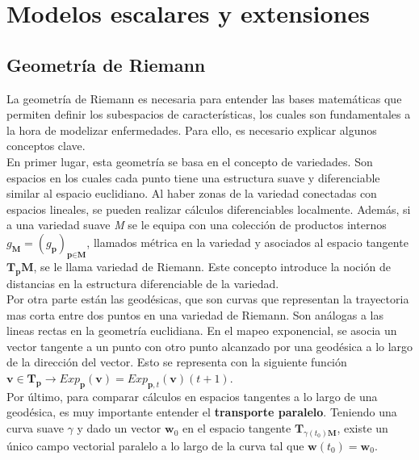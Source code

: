 	
	
	\section{Modelos escalares y extensiones}
	\subsection{Geometría de Riemann}
	La geometría de Riemann es necesaria para entender las bases matemáticas que permiten definir los subespacios de características, los cuales son fundamentales a la hora de modelizar enfermedades. Para ello, es necesario explicar algunos conceptos clave. \\
	
	En primer lugar, esta geometría se basa en el concepto de variedades. Son espacios en los cuales cada punto tiene una estructura suave y diferenciable similar al espacio euclidiano. Al haber zonas de la variedad conectadas con espacios lineales, se pueden realizar cálculos diferenciables localmente. Además, si a una variedad suave \textit{M} se le equipa con una colección de productos internos $g_{\textbf{M}}=(g_{\textbf{p}})_{\textbf{p}\in \textbf{M}}$, llamados métrica en la variedad y asociados al espacio tangente $\textbf{T}_{\textbf{p}}\textbf{M}$, se le llama variedad de Riemann. Este concepto introduce la noción de distancias en la estructura diferenciable de la variedad.\\
	
	Por otra parte están las geodésicas, que son curvas que representan la trayectoria mas corta entre dos puntos en una variedad de Riemann. Son análogas a las lineas rectas en la geometría euclidiana. En el mapeo exponencial, se asocia un vector tangente a un punto con otro punto alcanzado por una geodésica a lo largo de la dirección del vector. Esto se representa con la siguiente función $\textbf{v}\in\textbf{T}_{\textbf{p}}\rightarrow Exp_{\textbf{p}}(\textbf{v})=Exp_{\textbf{p},t}(\textbf{v})(t+1)$.\\
	
	Por último, para comparar cálculos en espacios tangentes a lo largo de una geodésica, es muy importante entender el \textbf{transporte paralelo}. Teniendo una curva suave $\gamma$ y dado un vector $\textbf{w}_{0}$ en el espacio tangente $\textbf{T}_{\gamma(t_{0})\textbf{M}}$, existe un único campo vectorial paralelo a lo largo de la curva tal que $\textbf{w}(t_{0})=\textbf{w}_{0}$.\cite[Capítulo 1]{koval2020learning}
	
